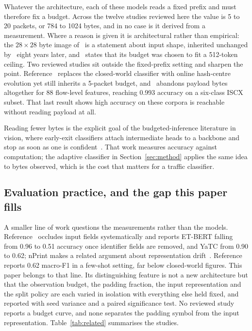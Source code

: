 \documentclass[pdflatex,sn-mathphys-num]{sn-jnl}
\theoremstyle{thmstyleone}%
\theoremstyle{thmstylethree}%
\begin{document}
Whatever the architecture, each of these models reads a fixed prefix and must
therefore fix a budget. Across the twelve studies reviewed here the value is
5 to 20 packets, or 784 to 1024 bytes, and in no case is it derived from a
measurement. Where a reason is given it is architectural rather than
empirical: the $28 \times 28$ byte image of~\cite{ustc} is a statement about
input shape, inherited unchanged by~\cite{p10} eight years later, and~\cite{p7}
states that its budget was chosen to fit a 512-token ceiling. Two reviewed
studies sit outside the fixed-prefix setting and sharpen the point.
Reference~\cite{p3} replaces the closed-world classifier with online
hash-centre evolution yet still inherits a 5-packet budget, and~\cite{p12}
abandons payload bytes altogether for 88 flow-level features, reaching 0.993
accuracy on a six-class ISCX subset. That last result shows high accuracy on
these corpora is reachable without reading payload at all.

Reading fewer bytes is the explicit goal of the budgeted-inference literature
in vision, where early-exit classifiers attach intermediate heads to a backbone
and stop as soon as one is confident~\cite{branchynet, msdnet, sdn}. That work
measures accuracy against computation; the adaptive classifier in
Section~\ref{sec:method} applies the same idea to bytes observed, which is the
cost that matters for a traffic classifier.

\subsection{Evaluation practice, and the gap this paper fills}

A smaller line of work questions the measurements rather than the models.
Reference~\cite{p5} occludes input fields systematically and reports ET-BERT
falling from 0.96 to 0.51 accuracy once identifier fields are removed, and YaTC
from 0.90 to 0.62; nPrint makes a related argument about representation
drift~\cite{nprint}. Reference~\cite{p11} reports 0.62 macro-F1 in a few-shot
setting, far below closed-world figures. This paper belongs to that line. Its
distinguishing feature is not a new architecture but that the observation
budget, the padding fraction, the input representation and the split policy are
each varied in isolation with everything else held fixed, and reported with
seed variance and a paired significance test. No reviewed study reports a
budget curve, and none separates the padding symbol from the input
representation. Table~\ref{tab:related} summarises the studies.
\end{document}
